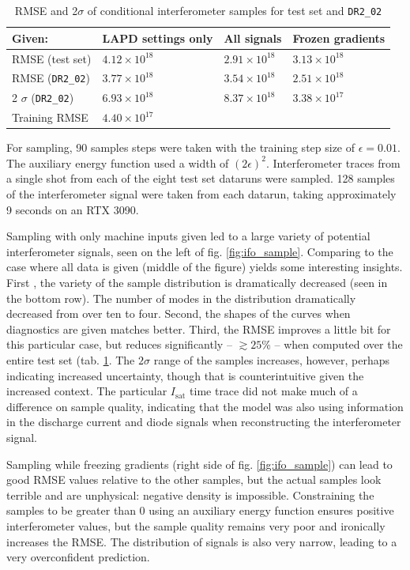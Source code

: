 \begin{table}
\small
	\centering
	\caption{RMSE and 2$\sigma$ of conditional interferometer samples for test set and \texttt{DR2\_02}}
	\label{tab:ifo-cond-sample}
	\begin{tabular}{l l l l}
		Given: & LAPD settings only & All signals & Frozen gradients \\
		\hline
		RMSE (test set) & $4.12 \times 10^{18}$ & $2.91 \times 10^{18}$ & $3.13 \times 10^{18}$ \\
		RMSE (\texttt{DR2\_02})& $3.77 \times 10^{18}$ & $3.54 \times 10^{18}$ & $2.51 \times 10^{18}$ \\
		2 $\sigma$ (\texttt{DR2\_02}) & $6.93 \times 10^{18}$ & $8.37 \times 10^{18}$ & $3.38 \times 10^{17}$ \\
		\hline
		Training RMSE & $4.40 \times 10^{17}$ \\
	\end{tabular}
\end{table}

For sampling, 90 samples steps were taken with the training step size of $\epsilon=0.01$. The auxiliary energy function used a width of $(2\epsilon)^2$. Interferometer traces from a single shot from each of the eight test set dataruns were sampled. 128 samples of the interferometer signal were taken from each datarun, taking approximately 9 seconds on an RTX 3090. 

Sampling with only machine inputs given led to a large variety of potential interferometer signals, seen on the left of fig. \ref{fig:ifo_sample}. Comparing to the case where all data is given (middle of the figure) yields some interesting insights. First , the variety of the sample distribution is dramatically decreased (seen in the bottom row). The number of modes in the distribution dramatically decreased from over ten to four. Second, the shapes of the curves when diagnostics are given matches better. Third, the RMSE improves a little bit for this particular case, but reduces significantly -- $\gtrsim 25$\% -- when computed over the entire test set (tab. \ref{tab:ifo-cond-sample}. The $2 \sigma$ range of the samples increases, however, perhaps indicating increased uncertainty, though that is counterintuitive given the increased context. The particular $I_\text{sat}$ time trace did not make much of a difference on sample quality, indicating that the model was also using information in the discharge current and diode signals when reconstructing the interferometer signal.

Sampling while freezing gradients (right side of fig. \ref{fig:ifo_sample}) can lead to good RMSE values relative to the other samples, but the actual samples look terrible and are unphysical: negative density is impossible. Constraining the samples to be greater than 0 using an auxiliary energy function ensures positive interferometer values, but the sample quality remains very poor and ironically increases the RMSE. The distribution of signals is also very narrow, leading to a very overconfident prediction. 

